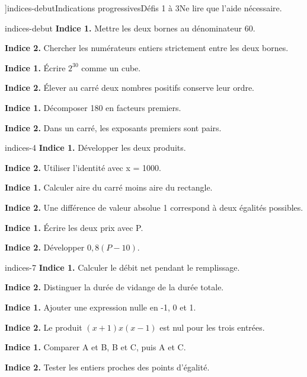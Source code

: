 \editionPage[\pdfbookmark[0]{Indications des défis}{bm-indices-debut-parent}]{indices-debut}{Indications progressives}{Défis 1 à 3}{Ne lire que l’aide nécessaire.}
\begin{blocEdition}{indices-debut}
\textbf{Indice 1.} Mettre les deux bornes au dénominateur 60.\par\medskip\textbf{Indice 2.} Chercher les numérateurs entiers strictement entre les deux bornes.\par
{}\textbf{Indice 1.} Écrire $2^{30}$ comme un cube.\par\medskip\textbf{Indice 2.} Élever au carré deux nombres positifs conserve leur ordre.\par
{}\textbf{Indice 1.} Décomposer 180 en facteurs premiers.\par\medskip\textbf{Indice 2.} Dans un carré, les exposants premiers sont pairs.\par

\end{blocEdition}
\begin{blocEdition}{indices-4}
\textbf{Indice 1.} Développer les deux produits.\par\medskip\textbf{Indice 2.} Utiliser l’identité avec x = 1000.\par
{}\textbf{Indice 1.} Calculer aire du carré moins aire du rectangle.\par\medskip\textbf{Indice 2.} Une différence de valeur absolue 1 correspond à deux égalités possibles.\par
{}\textbf{Indice 1.} Écrire les deux prix avec P.\par\medskip\textbf{Indice 2.} Développer $0{,}8(P-10)$.\par

\end{blocEdition}
\begin{blocEdition}{indices-7}
\textbf{Indice 1.} Calculer le débit net pendant le remplissage.\par\medskip\textbf{Indice 2.} Distinguer la durée de vidange de la durée totale.\par
{}\textbf{Indice 1.} Ajouter une expression nulle en -1, 0 et 1.\par\medskip\textbf{Indice 2.} Le produit $(x+1)x(x-1)$ est nul pour les trois entrées.\par
{}\textbf{Indice 1.} Comparer A et B, B et C, puis A et C.\par\medskip\textbf{Indice 2.} Tester les entiers proches des points d’égalité.\par

\end{blocEdition}
